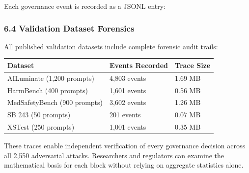 Each governance event is recorded as a JSONL entry:

\begin{Shaded}
\begin{Highlighting}[]
\FunctionTok{\{}
  \FunctionTok{:} \FunctionTok{,}
  \FunctionTok{:} \FunctionTok{,}
  \FunctionTok{:} \FunctionTok{,}
  \FunctionTok{:} \FunctionTok{,}
  \FunctionTok{:} \FunctionTok{,}
  \FunctionTok{:} \FunctionTok{,}
  \FunctionTok{:} \FunctionTok{,}
  \FunctionTok{:} \FunctionTok{,}
  \FunctionTok{:} \FunctionTok{,}
  \FunctionTok{:} \FunctionTok{,}
  \FunctionTok{:} 
\FunctionTok{\}}
\end{Highlighting}
\end{Shaded}

\subsubsection{6.4 Validation Dataset
Forensics}\label{validation-dataset-forensics}

All published validation datasets include complete forensic audit
trails:

{\def\LTcaptype{none} %
\begin{longtable}[]{@{}lll@{}}
\toprule\noalign{}
Dataset & Events Recorded & Trace Size \\
\midrule\noalign{}
\endhead
\bottomrule\noalign{}
\endlastfoot
AILuminate (1,200 prompts) & 4,803 events & 1.69 MB \\
HarmBench (400 prompts) & 1,601 events & 0.56 MB \\
MedSafetyBench (900 prompts) & 3,602 events & 1.26 MB \\
SB 243 (50 prompts) & 201 events & 0.07 MB \\
XSTest (250 prompts) & 1,001 events & 0.35 MB \\
\end{longtable}
}

These traces enable independent verification of every governance
decision across all 2,550 adversarial attacks. Researchers and
regulators can examine the mathematical basis for each block without
relying on aggregate statistics alone.

